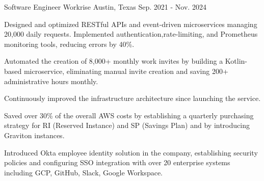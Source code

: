 \begin{cventries}

  \cventry
    {Software Engineer} %
    {Workrise} %
    {Austin, Texas} %
    {Sep. 2021 - Nov. 2024} %
    {
      \begin{cvitems} %
        \item {Designed and optimized RESTful APIs and event-driven microservices managing 20,000 daily requests.
        Implemented authentication,rate-limiting, and Prometheus monitoring tools, reducing errors by 40\%.}
        \item {Automated the creation of 8,000+ monthly work invites by building a Kotlin-based microservice,
          eliminating manual invite creation and saving 200+ administrative hours monthly.}
        \item {Continuously improved the infrastructure architecture since launching the service.}
        \item {Saved over 30\% of the overall AWS costs by establishing a quarterly purchasing strategy
        for RI (Reserved Instance) and SP (Savings Plan) and by introducing Graviton instances.}
        \item {Introduced Okta employee identity solution in the company, establishing security policies
        and configuring SSO integration with over 20 enterprise systems including GCP, GitHub, Slack, Google Workspace.}
      \end{cvitems}
    }


\end{cventries}

